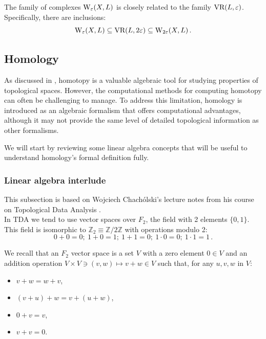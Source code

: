 \documentclass[../main.tex]{subfiles}
\begin{document}
\begin{proposition}
\label{prop:witness-vr}
The family of complexes $\text{\rm W}_\epsilon(X, L)$ is closely related to the family $\text{\rm VR}(L, \epsilon)$. Specifically, there are inclusions:
\[
\text{\rm W}_\epsilon(X, L) \subseteq \text{\rm VR}(L, 2\epsilon) \subseteq \text{\rm W}_{2\epsilon}(X, L)\,.
\]
\end{proposition}

\subsection{Homology}
As discussed in \cite{hatcher_algebraic_2002}, homotopy is a valuable algebraic tool for studying properties of topological spaces. However, the computational methods for computing homotopy can often be challenging to manage. To address this limitation, homology is introduced as an algebraic formalism that offers computational advantages, although it may not provide the same level of detailed topological information as other formalisms.

We will start by reviewing some linear algebra concepts that will be useful to understand homology's formal definition fully.

\subsubsection*{Linear algebra interlude}
This subsection is based on Wojciech Chachólski's lecture notes from his course on Topological Data Analysis \cite{chacholski_sf2956_2022}.\\

In TDA we tend to use vector spaces over $F_2$, the field with 2 elements $\{0,1\}$. This field is isomorphic to $\mathbb{Z}_2 \equiv \mathbb{Z}/2\mathbb{Z}$ with operations modulo 2:
\[
0+0 = 0;\ 1+0 = 1;\ 1+1 = 0;\ 1 \cdot 0 = 0;\ 1\cdot 1 = 1\,.
\]

We recall that an $F_2$ vector space is a set $V$ with a zero element $0 \in V$ and an addition operation $V \times V \ni (v,w) \mapsto v+w \in V$ such that, for any $u,v,w$ in $V$:
\begin{itemize}
    \item $v + w = w + v$,
    \item $(v + u) + w = v + (u + w)$,
    \item $0 + v = v$,
    \item $v + v = 0$.
\end{itemize}
\end{document}

